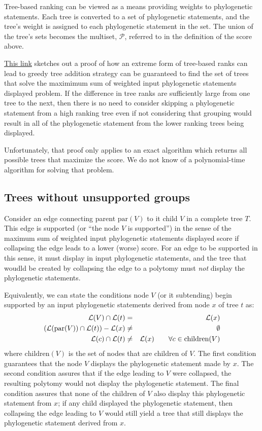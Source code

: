 \documentclass[11pt]{article}
\newcommand{\ps}{phylogenetic statement\xspace}
\newcommand{\pss}{phylogenetic statements\xspace}
\newcommand{\leafLabels}[1]{\ensuremath{\mathcal{L}(#1)}}
\newcommand{\parent}[1]{\ensuremath{\mbox{par}(#1)}}
\newcommand{\children}[1]{\ensuremath{\mbox{children}(#1)}}
\begin{document}
Tree-based ranking can be viewed as a means providing weights to \pss.
Each tree is converted to a set of \pss, and the tree's weight is 
    assigned to each \ps in the set.
The union of the tree's sets becomes the multiset, $\mathcal{P}$, referred to
    in the definition of the score above.

\href{https://github.com/OpenTreeOfLife/treemachine/wiki/MaxWeightOfInputTreeEdgesDisplayed}{This link}
    sketches out a proof of how an extreme form of tree-based ranks
    can lead to greedy tree addition strategy can be guaranteed to 
    find the set of trees that solve the maximimum sum of weighted input
    \pss displayed problem.
If the difference in tree ranks are sufficiently large from one tree to the next,
    then there is no need to consider skipping a \ps from a high ranking tree
    even if not considering that grouping would result in all of the \ps
    from the lower ranking trees being displayed.

Unfortunately, that proof only applies to an exact algorithm which returns
    all possible trees that maximize the score.
We do not know of a polynomial-time algorithm for solving that problem.

\subsection{Trees without unsupported groups}
Consider an edge connecting parent $\parent{V}$ to it child $V$ in a complete tree $T$.
This edge is supported (or ``the node $V$ is supported'') in the sense of the maximum sum of 
    weighted input \pss displayed score if
    collapsing the edge leads to a lower (worse) score.
For an edge to be supported in this sense, it must display in input \pss, and
    the tree that woudld be created by collapsing the edge to a polytomy must
    {\em not} display the \pss.

Equivalently, we can state the conditions node $V$ (or it subtending) begin supported
    by an input \pss derived from node $x$ of tree $t$ as:
\begin{eqnarray}
    \leafLabels{V} \cap \leafLabels{t} & = & \leafLabels{x}\\
    \left(\leafLabels{\parent{V}} \cap \leafLabels{t}\right) - \leafLabels{x} & \neq &\emptyset\\
    \leafLabels{c} \cap \leafLabels{t} & \neq & \leafLabels{x} \hskip 2em \forall c \in \children{V}
\end{eqnarray}
where $\children{V}$ is the set of nodes that are children of $V$.
The first condition guarantees that the node $V$ displays the \ps made by $x$.
The second condition assures that if the edge leading to $V$ were collapsed, the resulting polytomy would not display the \ps.
The final condition assures that none of the children of $V$ also display this \ps from $x$;
    if any child displayed the \ps, then collapsing the edge leading to $V$ would still
    yield a tree that still displays the \ps derived from $x$.
\end{document}
